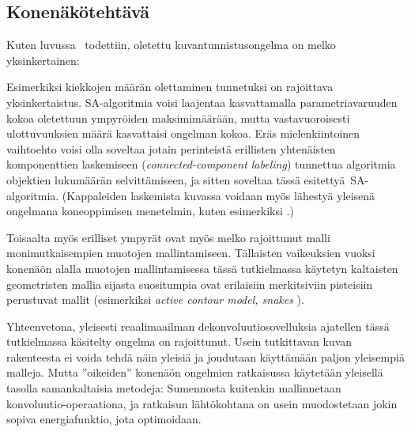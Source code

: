 \subsection{Konenäkötehtävä}
\label{sub:jp_konenako}

Kuten luvussa~ todettiin, oletettu kuvantunnistusongelma on melko yksinkertainen:

Esimerkiksi kiekkojen määrän olettaminen tunnetuksi on rajoittava yksinkertaistus.
SA-algoritmia voisi laajentaa kasvattamalla parametriavaruuden kokoa oletettuun ympyröiden maksimimäärään,
mutta vastavuoroisesti ulottuvuuksien määrä kasvattaisi ongelman kokoa.
Eräs mielenkiintoinen vaihtoehto voisi olla soveltaa jotain perinteistä erillisten yhtenäisten komponenttien laskemiseen (\emph{connected-component labeling}) tunnettua algoritmia \cite{cormenetal09} objektien lukumäärän selvittämiseen,
ja sitten soveltaa tässä esitettyä SA-algoritmia.
(Kappaleiden laskemista kuvassa voidaan myös lähestyä yleisenä ongelmana koneoppimisen menetelmin, kuten esimerkiksi \cite{lempitskyzissermanNIPS10}.)

Toisaalta myös erilliset ympyrät ovat myös melko rajoittunut malli monimutkaisempien muotojen mallintamiseen.
Tällaisten vaikeuksien vuoksi konenäön alalla muotojen mallintamisessa  tässä tutkielmassa käytetyn kaltaisten geometristen mallia sijasta suositumpia ovat erilaisiin merkitsiviin pisteisiin perustuvat mallit (esimerkiksi \emph{active contour model, snakes} \cite{prince2012}).

Yhteenvetona, yleisesti reaalimaailman dekonvoluutiosovelluksia ajatellen tässä tutkielmassa käsitelty ongelma on rajoittunut.
Usein tutkittavan kuvan rakenteesta ei voida tehdä näin yleisiä ja joudutaan käyttämään paljon yleisempiä malleja.
Mutta ''oikeiden'' konenäön ongelmien ratkaisussa käytetään yleisellä tasolla samankaltaisia metodeja:
Sumennosta kuitenkin mallinnetaan konvoluutio-operaationa,
ja ratkaisun lähtökohtana on usein muodostetaan jokin sopiva energiafunktio, jota optimoidaan.
